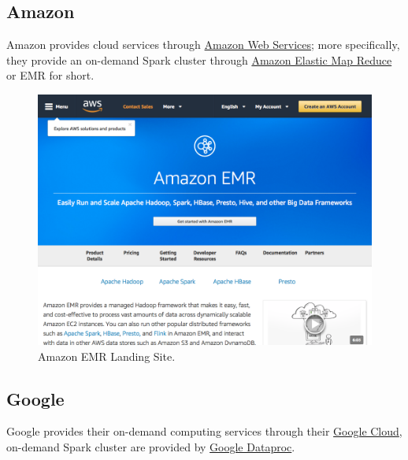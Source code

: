 \documentclass[]{book}
\theoremstyle{definition}
\theoremstyle{definition}
\theoremstyle{definition}
\theoremstyle{remark}
\begin{document}
\hypertarget{amazon}{%
\subsection{Amazon}\label{amazon}}

Amazon provides cloud services through
\href{https://aws.amazon.com/}{Amazon Web Services}; more specifically,
they provide an on-demand Spark cluster through
\href{https://aws.amazon.com/emr/}{Amazon Elastic Map Reduce} or EMR for
short.

\begin{figure}

{\centering \includegraphics[width=13.78in]{images/05-clusters-amazon-emr} 

}

\caption{Amazon EMR Landing Site.}\label{fig:amazon-emr}
\end{figure}

\hypertarget{google}{%
\subsection{Google}\label{google}}

Google provides their on-demand computing services through their
\href{https://cloud.google.com/}{Google Cloud}, on-demand Spark cluster
are provided by \href{https://cloud.google.com/dataproc/}{Google
Dataproc}.
\end{document}
